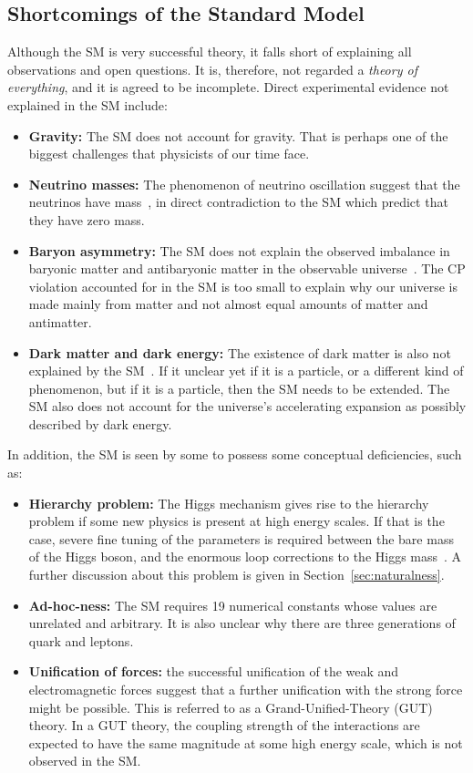 \subsection{Shortcomings of the Standard Model}

Although the SM is very successful theory, it falls short of explaining all observations and open questions. It is, therefore, not regarded a \emph{theory of everything}, and it is agreed to be incomplete. Direct experimental evidence not explained in the SM include:
\begin{itemize}
\item \textbf{Gravity:} The SM does not account for gravity. That is perhaps one of the biggest challenges that physicists of our time face.
\item \textbf{Neutrino masses:} The phenomenon of neutrino oscillation suggest that the neutrinos have mass~\cite{Gonzalez_Garcia_2008}, in direct contradiction to the SM which predict that they have zero mass.
\item \textbf{Baryon asymmetry:} The SM does not explain the observed imbalance in baryonic matter and antibaryonic matter in the observable universe~\cite{Canetti_2012}. The CP violation accounted for in the SM is too small to explain why our universe is made mainly from matter and not almost equal amounts of matter and antimatter.
\item \textbf{Dark matter and dark energy:} The existence of dark matter is also not explained by the SM~\cite{Garrett_2011}. If it unclear yet if it is a particle, or a different kind of phenomenon, but if it is a particle, then the SM needs to be extended. The SM also does not account for the  universe's accelerating expansion as possibly described by dark energy.
\end{itemize}

In addition, the SM is seen by some to possess some conceptual deficiencies, such as:
\begin{itemize}
\item \textbf{Hierarchy problem:} The Higgs mechanism gives rise to the hierarchy problem if some new physics is present at high energy scales. If that is the case, severe fine tuning of the parameters is required between the bare mass of the Higgs boson, and the enormous loop corrections to the Higgs mass~\cite{Jegerlehner_2014}. A further discussion about this problem is given in Section~\ref{sec:naturalness}.
\item \textbf{Ad-hoc-ness:} The SM requires 19 numerical constants whose values are unrelated and arbitrary. It is also unclear why there are three generations of quark and leptons.
\item \textbf{Unification of forces:} the successful unification of the weak and electromagnetic forces suggest that a further unification with the strong force might be possible. This is referred to as a Grand-Unified-Theory (GUT) theory. In a GUT theory, the coupling strength of the interactions are expected to have the same magnitude at some high energy scale, which is not observed in the SM.
\end{itemize}

